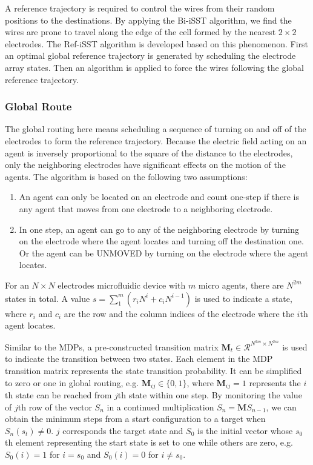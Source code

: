 \documentclass[conference, onecolumn]{IEEEtran}
\begin{document}
A reference trajectory is required to control the wires from their random positions to the destinations. By applying the Bi-iSST algorithm, we find the wires are prone to travel along the edge of the cell formed by the nearest $2 \times 2$ electrodes. The Ref-iSST algorithm is developed based on this phenomenon. First an optimal global reference trajectory is generated by scheduling the electrode array states. Then an algorithm is applied to force the wires following the global reference trajectory. 

\subsubsection{Global Route}
The global routing here means scheduling a sequence of
turning on and off of the electrodes to form the reference trajectory. Because the electric field acting on an agent is inversely proportional to the square of the distance to the electrodes, only the neighboring electrodes have significant effects on the motion of the agents. The algorithm is based on the following two assumptions:
\begin{enumerate}	
	\item An agent can only be located on an electrode and count one-step if there is any agent	that moves from one electrode to a neighboring electrode.
	\item In one step, an agent can go to any of the neighboring electrode by turning on the electrode where the agent locates and turning off the destination one. Or the agent can be UNMOVED by turning on the electrode where the agent locates.
\end{enumerate}
For an $N \times N$ electrodes microfluidic device with $m$ micro agents, there are $N^{2m}$ states in total. A value $s = \sum_{1}^{m}(r_iN^i+c_iN^{i-1})$ is used to indicate a state, where $r_i$ and $c_i$ are the row and the column indices of the electrode where the $i$th agent locates. 

Similar to the MDPs, a pre-constructed transition matrix $\textbf{M}_t \in \mathcal{R}^{N^{2m} \times N^{2m}}$ is used to indicate the transition between two states. Each element in the MDP transition matrix represents the state transition probability. It can be simplified to zero or one in global routing, e.g. $\textbf{M}_{ij} \in \{0,1\}$, where $\textbf{M}_{ij} = 1$ represents the $i$th state can be reached from $j$th state within one step.
By monitoring the value of $j$th row of the vector $S_n$ in a continued multiplication $S_n =\textbf{M}S_{n-1}$, we can obtain the minimum steps from a start configuration to a target when $S_n(s_t)\neq 0$. $j$ corresponds the target state and $S_0$ is the initial vector whose $s_0$th element representing the start state is set to one while others are zero, e.g. $S_0(i) = 1$ for $i=s_0$ and $S_0(i) = 0$ for $i \neq s_0$.
\end{document}
